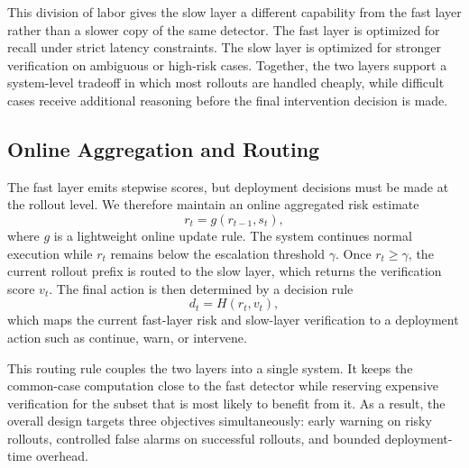 This division of labor gives the slow layer a different capability from
the fast layer rather than a slower copy of the same detector.
The fast layer is optimized for recall under strict latency
constraints.
The slow layer is optimized for stronger verification on ambiguous or
high-risk cases.
Together, the two layers support a system-level tradeoff in which most
rollouts are handled cheaply, while difficult cases receive additional
reasoning before the final intervention decision is made.

\subsection{Online Aggregation and Routing}

The fast layer emits stepwise scores, but deployment decisions must be
made at the rollout level.
We therefore maintain an online aggregated risk estimate
\[
  r_t = g(r_{t-1}, s_t),
\]
where $g$ is a lightweight online update rule.
The system continues normal execution while $r_t$ remains below the
escalation threshold $\gamma$.
Once $r_t \ge \gamma$, the current rollout prefix is routed to the slow
layer, which returns the verification score $v_t$.
The final action is then determined by a decision rule
\[
  d_t = H(r_t, v_t),
\]
which maps the current fast-layer risk and slow-layer verification to a
deployment action such as continue, warn, or intervene.

This routing rule couples the two layers into a single system.
It keeps the common-case computation close to the fast detector while
reserving expensive verification for the subset that is most likely to
benefit from it.
As a result, the overall design targets three objectives
simultaneously: early warning on risky rollouts, controlled false
alarms on successful rollouts, and bounded deployment-time overhead.
